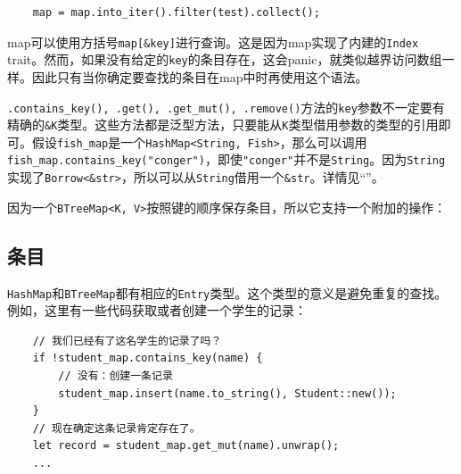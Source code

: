 


\begin{verbatim}
    map = map.into_iter().filter(test).collect();
\end{verbatim}


map可以使用方括号\texttt{map[\&key]}进行查询。这是因为map实现了内建的\texttt{Index} trait。然而，如果没有给定的\texttt{key}的条目存在，这会panic，就类似越界访问数组一样。因此只有当你确定要查找的条目在map中时再使用这个语法。

\texttt{.contains\_key(), .get(), .get\_mut(), .remove()}方法的\texttt{key}参数不一定要有精确的\texttt{\&K}类型。这些方法都是泛型方法，只要能从\texttt{K}类型借用参数的类型的引用即可。假设\texttt{fish\_map}是一个\texttt{HashMap<String, Fish>}，那么可以调用\texttt{fish\_map.contains\_key("conger")}，即使\texttt{"conger"}并不是\texttt{String}。因为\texttt{String}实现了\texttt{Borrow<\&str>}，所以可以从\texttt{String}借用一个\texttt{\&str}。详情见“”。

因为一个\texttt{BTreeMap<K, V>}按照键的顺序保存条目，所以它支持一个附加的操作：

\subsection{条目}\label{entry}
\texttt{HashMap}和\texttt{BTreeMap}都有相应的\texttt{Entry}类型。这个类型的意义是避免重复的查找。例如，这里有一些代码获取或者创建一个学生的记录：
\begin{verbatim}
    // 我们已经有了这名学生的记录了吗？
    if !student_map.contains_key(name) {
        // 没有：创建一条记录
        student_map.insert(name.to_string(), Student::new());
    }
    // 现在确定这条记录肯定存在了。
    let record = student_map.get_mut(name).unwrap();
    ...
\end{verbatim}

